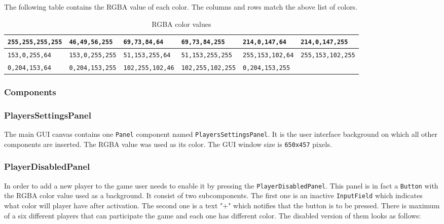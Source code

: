 \noindent The following table contains the RGBA value of each color. The columns and rows match the above list of colors.
\begin{center}
	\begin{table}[h]
  		\centering
  		\caption{RGBA color values}
  		\begin{tabular}{ |m{1.31cm}|m{1.31cm}|m{1.31cm}|m{1.31cm}|m{1.31cm}|m{1.31cm}| }
    		\hline
    		\tiny\verb|255,255,255,255| & \tiny\verb|46,49,56,255| & \tiny\verb|69,73,84,64| & \tiny\verb|69,73,84,255| & \tiny\verb|214,0,147,64| & \tiny\verb|214,0,147,255| \\
   			\hline
   			\tiny\verb|153,0,255,64| & \tiny\verb|153,0,255,255| & \tiny\verb|51,153,255,64| & \tiny\verb|51,153,255,255| & \tiny\verb|255,153,102,64| & \tiny\verb|255,153,102,255| \\
    		\hline
    		\tiny\verb|0,204,153,64| & \tiny\verb|0,204,153,255| & \tiny\verb|102,255,102,46| & \tiny\verb|102,255,102,255| & \tiny\verb|0,204,153,255| &  \\
   			\hline
		\end{tabular}
	\end{table}
\end{center}

\subsubsection{Components}

\subsubsection*{PlayersSettingsPanel}\label{gui-playerssettingspanel}
\noindent The main GUI canvas contains one \verb+Panel+ component named \verb+PlayersSettingsPanel+. It is the user interface background on which all other components are inserted. The RGBA value  was used as its color. The GUI window size is \verb|650x457| pixels.

\subsubsection*{PlayerDisabledPanel}\label{gui-playerdisabledpanel}
\noindent In order to add a new player to the game user needs to enable it by pressing the \verb+PlayerDisabledPanel+. This panel is in fact a \verb+Button+ with the RGBA color value  used as a background. It consist of two subcomponents. The first one is an inactive \verb+InputField+ which indicates what color will player have after activation. The second one is a text "\verb+++" which notifies that the button is to be pressed. There is maximum of a six different players that can participate the game and each one has different color. The disabled version of them looks as follows:

